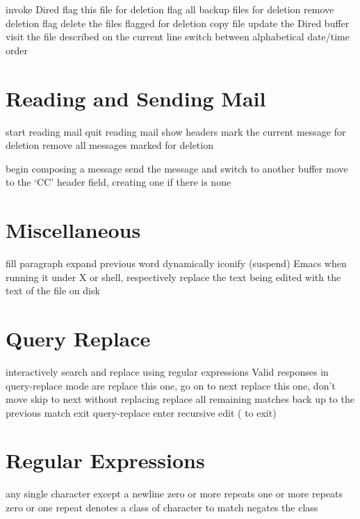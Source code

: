  invoke Dired
 flag this file for deletion
\key{\~{}} flag all backup files for deletion
 remove deletion flag
 delete the files flagged for deletion
 copy file
 update the Dired buffer
 visit the file described on the current line
 switch between alphabetical date/time order

\section{Reading and Sending Mail}

 start reading mail
 quit reading mail
 show headers
 mark the current message for deletion
 remove all messages marked for deletion

 begin composing a message
 send the message and switch to another buffer
 move to the `CC' header field, creating one
  if there is none

\section{Miscellaneous}

 fill paragraph
 expand previous word dynamically
 iconify (suspend) Emacs when running it under X or
  shell, respectively
 replace the text being edited with the
  text of the file on disk

\section{Query Replace}

 interactively search and replace
 using regular expressions
\askip
Valid responses in query-replace mode are
\askip
{} replace this one, go on to next
\key{,} replace this one, don't move
 skip to next without replacing
\key{!} replace all remaining matches
\key{\^{}} back up to the previous match
 exit query-replace
 enter recursive edit ( to exit)

\section{Regular Expressions}

 any single character except a newline
\key{*} zero or more repeats
\key{+} one or more repeats
 zero or one repeat
\key{[$\ldots$]} denotes a class of character to match
\key{[\^{}$\ldots$]} negates the class

